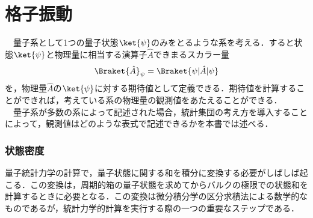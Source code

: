 \part{格子振動}
　量子系として1つの量子状態$\ket{\psi}$のみをとるような系を考える．すると状態$\ket{\psi}$と物理量に相当する演算子$\hat{A}$できまるスカラー量
\begin{align}
\label{ev}
\Braket{\hat{A}}_{\psi}=\Braket{\psi|\hat{A}|\psi}
\end{align}
を，物理量$\hat{A}$の$\ket{\psi}$に対する期待値として定義できる．期待値を計算することができれば，考えている系の物理量の観測値をあたえることができる．\\
　量子系が多数の系によって記述された場合，統計集団の考え方を導入することによって，観測値はどのような表式で記述できるかを本書では述べる．






\section{状態密度}
量子統計力学の計算で，量子状態に関する和を積分に変換する必要がしばしば起こる．この変換は，周期的箱の量子状態を求めてからバルクの極限での状態和を計算するときに必要となる．この変換は微分積分学の区分求積法による数学的なものであるが，統計力学的計算を実行する際の一つの重要なステップである．
